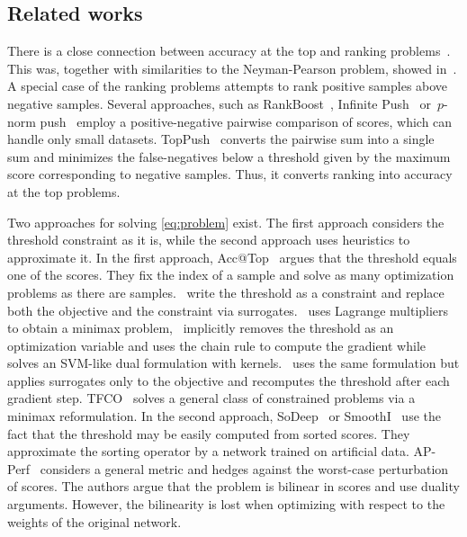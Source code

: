 \subsection{Related works}

There is a close connection between accuracy at the top and ranking problems~\cite{batmaz2019review,werner2019review}. This was, together with similarities to the Neyman-Pearson problem, showed in~\cite{adam2021general}. A special case of the ranking problems attempts to rank positive samples above negative samples. Several approaches, such as RankBoost~\cite{freund2003efficient}, Infinite Push~\cite{agarwal2011infinite} or~$p$-norm push~\cite{rudin2009pnorm} employ a positive-negative pairwise comparison of scores, which can handle only small datasets. TopPush~\cite{li2014top} converts the pairwise sum into a single sum and minimizes the false-negatives below a threshold given by the maximum score corresponding to negative samples. Thus, it converts ranking into accuracy at the top problems.

Two approaches for solving \eqref{eq:problem} exist. The first approach considers the threshold constraint as it is, while the second approach uses heuristics to approximate it. In the first approach, Acc@Top~\cite{boyd2012accuracy} argues that the threshold equals one of the scores. They fix the index of a sample and solve as many optimization problems as there are samples.~\cite{eban2017scalable,adam2021general,kumar2021implicit} write the threshold as a constraint and replace both the objective and the constraint via surrogates.~\cite{eban2017scalable} uses Lagrange multipliers to obtain a minimax problem,~\cite{mackey2018constrained} implicitly removes the threshold as an optimization variable and uses the chain rule to compute the gradient while~\cite{macha2020nonlinear} solves an SVM-like dual formulation with kernels.~\cite{grill2016learning} uses the same formulation but applies surrogates only to the objective and recomputes the threshold after each gradient step. TFCO~\cite{cotter2019optimization} solves a general class of constrained problems via a minimax reformulation. In the second approach, SoDeep~\cite{engilberge2019sodeep} or SmoothI~\cite{thonet2021smoothi} use the fact that the threshold may be easily computed from sorted scores. They approximate the sorting operator by a network trained on artificial data. AP-Perf~\cite{fathony2019ap} considers a general metric and hedges against the worst-case perturbation of scores. The authors argue that the problem is bilinear in scores and use duality arguments. However, the bilinearity is lost when optimizing with respect to the weights of the original network. 

